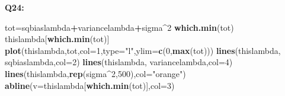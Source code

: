 \documentclass[]{article}
\newenvironment{Shaded}{\begin{snugshade}}{\end{snugshade}}
\newcommand{\KeywordTok}[1]{\textcolor[rgb]{0.13,0.29,0.53}{\textbf{#1}}}
\newcommand{\DataTypeTok}[1]{\textcolor[rgb]{0.13,0.29,0.53}{#1}}
\newcommand{\DecValTok}[1]{\textcolor[rgb]{0.00,0.00,0.81}{#1}}
\newcommand{\StringTok}[1]{\textcolor[rgb]{0.31,0.60,0.02}{#1}}
\newcommand{\CommentTok}[1]{\textcolor[rgb]{0.56,0.35,0.01}{\textit{#1}}}
\newcommand{\OtherTok}[1]{\textcolor[rgb]{0.56,0.35,0.01}{#1}}
\newcommand{\ControlFlowTok}[1]{\textcolor[rgb]{0.13,0.29,0.53}{\textbf{#1}}}
\newcommand{\OperatorTok}[1]{\textcolor[rgb]{0.81,0.36,0.00}{\textbf{#1}}}
\newcommand{\NormalTok}[1]{#1}
\begin{document}
\begin{Shaded}
\end{Shaded}

\textbf{Q24:}

\begin{Shaded}
\begin{Highlighting}[]
\NormalTok{tot=sqbiaslambda}\OperatorTok{+}\NormalTok{variancelambda}\OperatorTok{+}\NormalTok{sigma}\OperatorTok{^}\DecValTok{2}
\KeywordTok{which.min}\NormalTok{(tot)}
\NormalTok{thislambda[}\KeywordTok{which.min}\NormalTok{(tot)]}
\KeywordTok{plot}\NormalTok{(thislambda,tot,}\DataTypeTok{col=}\DecValTok{1}\NormalTok{,}\DataTypeTok{type=}\StringTok{"l"}\NormalTok{,}\DataTypeTok{ylim=}\KeywordTok{c}\NormalTok{(}\DecValTok{0}\NormalTok{,}\KeywordTok{max}\NormalTok{(tot)))}
\KeywordTok{lines}\NormalTok{(thislambda, sqbiaslambda,}\DataTypeTok{col=}\DecValTok{2}\NormalTok{)}
\KeywordTok{lines}\NormalTok{(thislambda, variancelambda,}\DataTypeTok{col=}\DecValTok{4}\NormalTok{)}
\KeywordTok{lines}\NormalTok{(thislambda,}\KeywordTok{rep}\NormalTok{(sigma}\OperatorTok{^}\DecValTok{2}\NormalTok{,}\DecValTok{500}\NormalTok{),}\DataTypeTok{col=}\StringTok{"orange"}\NormalTok{)}
\KeywordTok{abline}\NormalTok{(}\DataTypeTok{v=}\NormalTok{thislambda[}\KeywordTok{which.min}\NormalTok{(tot)],}\DataTypeTok{col=}\DecValTok{3}\NormalTok{)}
\end{Highlighting}
\end{Shaded}
\end{document}
